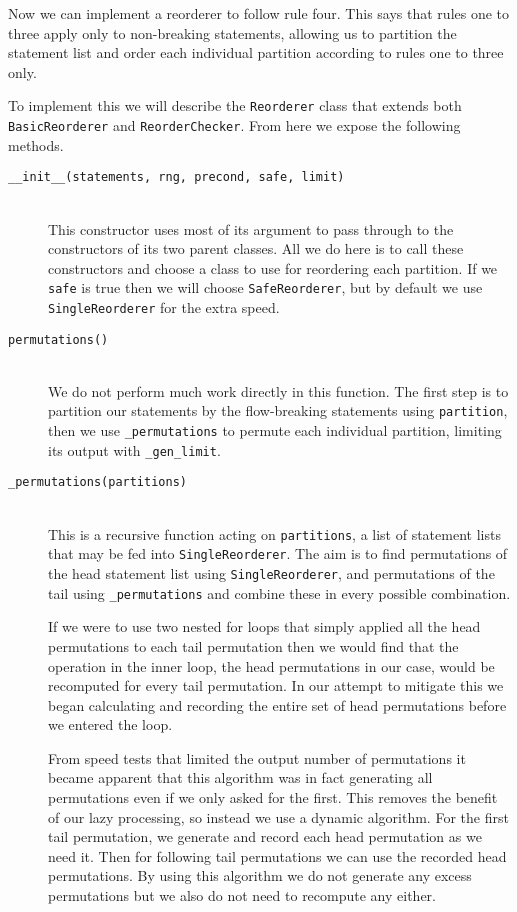 \documentclass[twoside,a4paper]{report}
\begin{document}
Now we can implement a reorderer to follow rule four. This says that rules one to three apply only to non-breaking statements, allowing us to partition
the statement list and order each individual partition according to rules one to three only.

To implement this we will describe the \texttt{Reorderer} class that extends both \texttt{BasicReorderer} and \texttt{ReorderChecker}. From here we expose
the following methods.

\begin{description}
\item[\texttt{\_\_init\_\_(statements, rng, precond, safe, limit)}] \hfill \\
This constructor uses most of its argument to pass through to the constructors of its two parent classes. All we do here is to call these constructors
and choose a class to use for reordering each partition. If we \texttt{safe} is true then we will choose \texttt{SafeReorderer}, but by default we use
\texttt{SingleReorderer} for the extra speed.

\item[\texttt{permutations()}] \hfill \\
We do not perform much work directly in this function. The first step is to partition our statements by the flow-breaking statements using \texttt{partition},
then we use \texttt{\_permutations} to permute each individual partition, limiting its output with \texttt{\_gen\_limit}.

\item[\texttt{\_permutations(partitions)}] \hfill \\
This is a recursive function acting on \texttt{partitions}, a list of statement lists that may be fed into \texttt{SingleReorderer}. The aim is to find
permutations of the head statement list using \texttt{SingleReorderer}, and permutations of the tail using \texttt{\_permutations} and combine these in every
possible combination.

If we were to use two nested for loops that simply applied all the head permutations to each tail permutation then we would find that the operation in the inner
loop, the head permutations in our case, would be recomputed for every tail permutation. In our attempt to mitigate this we began calculating and recording the
entire set of head permutations before we entered the loop.

From speed tests that limited the output number of permutations it became apparent that this algorithm was in fact generating all permutations even if we only
asked for the first. This removes the benefit of our lazy processing, so instead we use a dynamic algorithm. For the first tail permutation, we generate and
record each head permutation as we need it. Then for following tail permutations we can use the recorded head permutations. By using this algorithm we do not
generate any excess permutations but we also do not need to recompute any either.


\end{description}
\end{document}
